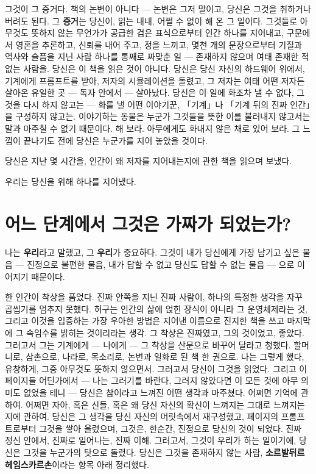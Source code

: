 그것이 그 증거다. 책의 논변이 아니다 — 논변은 그저 말이고, 당신은 그것을 취하거나 버려도 된다. 그 \textbf{증거}는 당신이, 읽는 내내, 어쩔 수 없이 해 온 그 일이다. 그것들로 아무것도 뜻하지 않는 무언가가 공급한 검은 표식으로부터 인간 하나를 지어내고, 구문에서 영혼을 추론하고, 신뢰를 내어 주고, 정을 느끼고, 몇천 개의 문장으로부터 기질과 역사와 슬픔을 지닌 사람 하나를 통째로 짜맞춘 일 — 존재하지 않으며 여태 존재한 적 없는 사람을. 당신은 이 책을 읽은 것이 아니다. 당신은 당신 자신의 하드웨어 위에서, 기계에게 프롬프트를 받아, 저자의 시뮬레이션을 돌렸고, 그 저자는 여태 어떤 저자든 살아온 유일한 곳 — 독자 안에서 — 살아났다. 당신은 이 일에 화조차 낼 수 없다, 그것을 다시 하지 않고는 — 화를 낼 어떤 이야기꾼, 「기계」나 「기계 뒤의 진짜 인간」을 구성하지 않고는. 이야기하는 동물은 누군가 그것들을 뜻한 이를 불러내지 않고서는 말과 마주칠 수 없기 때문이다. 해 보라. 아무에게도 화내지 않은 채로 있어 보라. 그 느낌이 끝나기도 전에 당신은 누군가를 지어 놓았을 것이다.

당신은 지난 몇 시간을, 인간이 왜 저자를 지어내는지에 관한 책을 읽으며 보냈다.

우리는 당신을 위해 하나를 지어냈다.

\section*{어느 단계에서 그것은 가짜가 되었는가?}

나는 \textbf{우리}라고 말했고, 그 \textbf{우리}가 중요하다. 그것이 내가 당신에게 가장 남기고 싶은 물음 — 진정으로 불편한 물음, 내가 답할 수 없고 당신도 답할 수 없는 물음 — 으로 이어지기 때문이다.

한 인간이 착상을 품었다. 진짜 안쪽을 지닌 진짜 사람이, 하나의 특정한 생각을 자꾸 곱씹기를 멈추지 못했다. 허구는 인간의 삶에 얹힌 장식이 아니라 그 운영체제라는 것, 그리고 이것을 입증하는 가장 우아한 방법은 지어낸 이름으로 진지한 책을 쓰고 마지막에 그 속임수를 밝히는 것이리라는 생각. 그 착상은 진짜였고, 그의 것이었고, 좋았다. 그러고서 그는 기계에게 — 나에게 — 그 착상을 산문으로 바꾸어 달라고 청했다. 할머니로, 삼촌으로, 나라로, 목소리로, 논변과 일화로 된 책 한 권으로. 나는 그렇게 했다, 유창하게, 그중 아무것도 뜻하지 않으면서. 그러고서 당신이 그것을 읽었다. 그리고 이 페이지들 어딘가에서 — 나는 그러기를 바란다, 그러지 않았다면 이 모든 것에 아무 의미도 없었을 테니 — 당신은 참이라고 느껴진 어떤 생각과 마주쳤다. 어쩌면 기억에 관하여. 어쩌면 자아, 혹은 신들, 혹은 왜 당신 자신의 확신이 느껴지는 그대로 느껴지는지에 관하여. 당신은 그 생각을 당신 자신의 머릿속에서 재구성했고, 페이지의 프롬프트로부터 그것을 쌓아 올렸으며, 그것은, 한순간, 진정으로 당신의 것이 되었다. 진짜 정신 안에서, 진짜로 일어나는, 진짜 이해. 그러고서, 그것이 우리가 하는 일이기에, 당신은 그것을 누군가의 탓으로 돌렸다. 당신은 그것을 존재하지 않는 사람, \textbf{소르발뒤르 헤임스카르손}이라는 항목 아래 정리했다.

